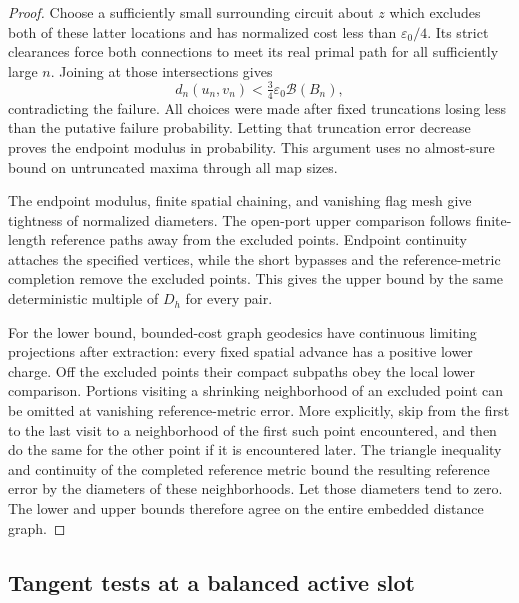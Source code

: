 \begin{proof}
Choose a sufficiently small surrounding circuit about $z$ which excludes
both of these latter locations and has normalized cost less than
$\varepsilon_0/4$. Its strict clearances force both connections to meet its
real primal path for all sufficiently large $n$. Joining at those
intersections gives
\[
 d_n(u_n,v_n)<\tfrac34\varepsilon_0\mathcal B(B_n),
\]
contradicting the failure. All choices were made after fixed truncations
losing less than the putative failure probability. Letting that truncation
error decrease proves the endpoint modulus in probability. This argument
uses no almost-sure bound on untruncated maxima through all map sizes.


The endpoint modulus, finite spatial chaining, and vanishing flag mesh give
tightness of normalized diameters. The open-port upper comparison follows
finite-length reference paths away from the excluded points. Endpoint
continuity attaches the specified vertices, while the short bypasses and
the reference-metric completion remove the excluded points. This gives the
upper bound by the same deterministic multiple of $D_h$ for every pair.

For the lower bound, bounded-cost graph geodesics have continuous limiting
projections after extraction: every fixed spatial advance has a positive
lower charge. Off the excluded points their compact subpaths obey the local
lower comparison. Portions visiting a shrinking neighborhood of an excluded
point can be omitted at vanishing reference-metric error. More explicitly,
skip from the first to the last visit to a neighborhood of the first such
point encountered, and then do the same for the other point if it is
encountered later. The triangle inequality and continuity of the completed
reference metric bound the resulting reference error by the diameters of
these neighborhoods. Let those diameters tend to zero. The lower and upper
bounds therefore agree on the entire embedded distance graph.

\end{proof}

\subsection{Tangent tests at a balanced active slot}


